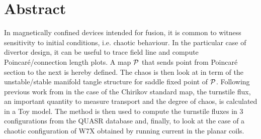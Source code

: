 \begingroup
\let\cleardoublepage\clearpage

\setcounter{page}{2}
\chapter*{Abstract}

In magnetically confined devices intended for fusion, it is common to witness sensitivity to initial conditions, i.e. chaotic behaviour. In the particular case of divertor design, it can be useful to trace field line and compute Poincaré/connection length plots. A map $\mathcal{P}$ that sends point from Poincaré section to the next is hereby defined. The chaos is then look at in term of the unstable/stable manifold tangle structure for saddle fixed point of $\mathcal{P}$. Following previous work from \cite{meiss_thirty_2015} in the case of the Chirikov standard map, the turnstile flux, an important quantity to measure transport and the degree of chaos, is calculated in a Toy model. The method is then used to compute the turnstile fluxes in 3 configurations from the QUASR database and, finally, to look at the case of a chaotic configuration of W7X obtained by running current in the planar coils.








